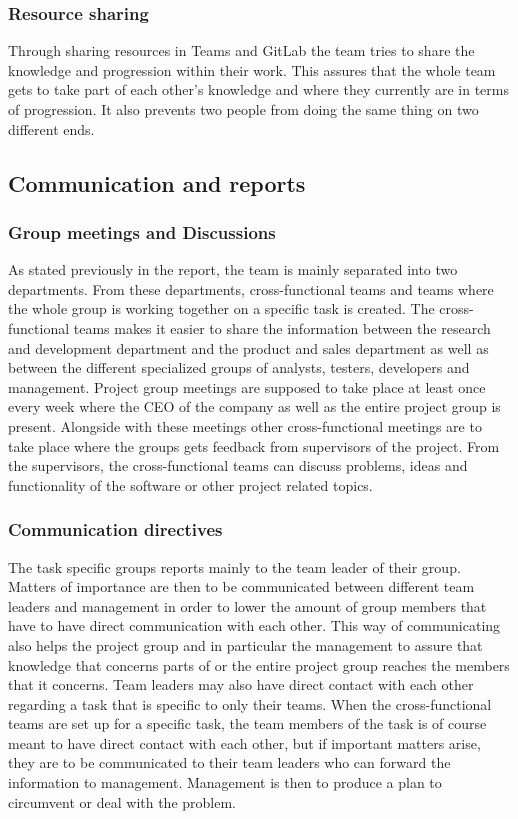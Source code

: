 \subsubsection{Resource sharing}
Through sharing resources in Teams and GitLab the team tries to share the knowledge and progression within their work. This assures that the whole team gets to take part of each other’s knowledge and where they currently are in terms of progression. It also prevents two people from doing the same thing on two different ends. 

\subsection{Communication and reports}
\subsubsection{Group meetings and Discussions}
As stated previously in the report, the team is mainly separated into two departments. From these departments, cross-functional teams and teams where the whole group is working together on a specific task is created. The cross-functional teams makes it easier to share the information between the research and development department and the product and sales department as well as between the different specialized groups of analysts, testers, developers and management. Project group meetings are supposed to take place at least once every week where the CEO of the company as well as the entire project group is present. Alongside with these meetings other cross-functional meetings are to take place where the groups gets feedback from supervisors of the project. From the supervisors, the cross-functional teams can discuss problems, ideas and functionality of the software or other project related topics. 

\subsubsection{Communication directives}
The task specific groups reports mainly to the team leader of their group. Matters of importance are then to be communicated between different team leaders and management in order to lower the amount of group members that have to have direct communication with each other. This way of communicating also helps the project group and in particular the management to assure that knowledge that concerns parts of or the entire project group reaches the members that it concerns. Team leaders may also have direct contact with each other regarding a task that is specific to only their teams. When the cross-functional teams are set up for a specific task, the team members of the task is of course meant to have direct contact with each other, but if important matters arise, they are to be communicated to their team leaders who can forward the information to management. Management is then to produce a plan to circumvent or deal with the problem. 

